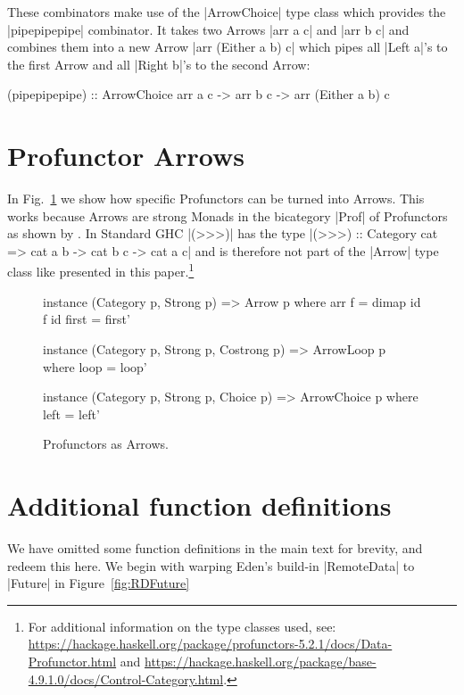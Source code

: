 These combinators make use of the |ArrowChoice| type class which provides the |pipepipepipe| combinator. It takes two Arrows |arr a c| and |arr b c| and combines them into a new Arrow |arr (Either a b) c| which pipes all |Left a|'s to the first Arrow and all |Right b|'s to the second Arrow:
\begin{code}
(pipepipepipe) :: ArrowChoice arr a c -> arr b c -> arr (Either a b) c
\end{code}

\section{Profunctor Arrows}
\label{app:profunctorArrows}

In Fig.~\ref{fig:profunctorArrow} we show how specific Profunctors can be turned into Arrows. This works because Arrows are strong Monads in the bicategory |Prof| of Profunctors as shown by \citet{Asada:2010:ASM:1863597.1863607}. In Standard GHC |(>>>)| has the type |(>>>) :: Category cat => cat a b -> cat b c -> cat a c| and is therefore not part of the |Arrow| type class like presented in this paper.\footnote{For additional information on the type classes used, see: \url{https://hackage.haskell.org/package/profunctors-5.2.1/docs/Data-Profunctor.html} and \url{https://hackage.haskell.org/package/base-4.9.1.0/docs/Control-Category.html}.}


\begin{figure}[h]
\begin{code}
instance (Category p, Strong p) => Arrow p where
  arr f = dimap id f id
  first = first'

instance (Category p, Strong p, Costrong p) => ArrowLoop p where
  loop = loop'

instance (Category p, Strong p, Choice p) => ArrowChoice p where
  left = left'
\end{code}
\caption{Profunctors as Arrows.}
\label{fig:profunctorArrow}
\end{figure}

\section{Additional function definitions}
\label{app:omitted}
We have omitted some function definitions in the main text for
brevity, and redeem this here.
%
%
%
We begin with warping Eden's build-in |RemoteData| to |Future| in
Figure~\ref{fig:RDFuture}

